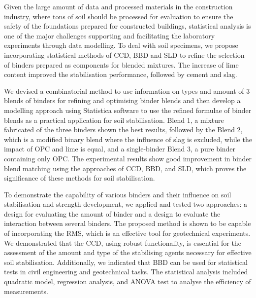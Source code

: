 \documentclass[eprint,
]{actapoly}
\begin{document}
Given the large amount of data and processed materials in the construction industry, where tons of soil should be processed for evaluation to ensure the safety of the foundations prepared for constructed buildings, statistical analysis is one of the major challenges supporting and facilitating the laboratory experiments through data modelling. To deal with soil specimens, we propose incorporating statistical methods of CCD, BBD and SLD to refine the selection of binders prepared as components for blended mixtures. The increase of lime content improved the stabilisation performance, followed by cement and slag. 

We devised a combinatorial method to use information on types and amount of 3 blends of binders for refining and optimising binder blends and then develop a modelling approach using Statistica software to use the refined formulae of binder blends as a practical application for soil stabilisation. Blend 1, a mixture fabricated of the three binders shown the best results, followed by the Blend 2, which is a modified binary blend where the influence of slag is excluded, while the impact of OPC and lime is equal, and a single-binder Blend 3, a pure binder containing only OPC. The experimental results show good improvement in binder blend matching using the approaches of CCD, BBD, and SLD, which proves the significance of these methods for soil stabilisation.

To demonstrate the capability of various binders and their influence on soil stabilisation and strength development, we applied and tested two approaches: a design for evaluating the amount of binder and a design to evaluate the interaction between several binders. The proposed method is shown to be capable of incorporating the RMS, which is an effective tool for geotechnical experiments. We demonstrated that the CCD, using robust functionality, is essential for the assessment of the amount and type of the stabilising agents necessary for effective soil stabilisation. Additionally, we indicated that BBD can be used for statistical tests in civil engineering and geotechnical tasks. The statistical analysis included quadratic model, regression analysis, and ANOVA test to analyse the efficiency of measurements.
\end{document}
